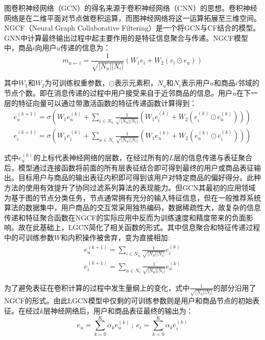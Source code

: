 \documentclass[lang=cn,11pt,a4paper,cite=authoryear]{elegantpaper}
\begin{document}
图卷积神经网络（GCN）的得名来源于卷积神经网络（CNN）的思想。卷积神经网络是在二维平面对节点做卷积运算，而图神经网络将这一运算拓展至三维空间。NGCF（Neural Graph Collaborative Filtering）是一个将GCN与CF结合的模型。GNN中计算最终输出过程中起主要作用的是特征信息聚合与传递。NGCF模型中，商品$i$向用户$u$传递的信息为：
\begin{equation}
  m_{u \leftarrow i} = \frac{1}{\sqrt{|N_u||N_i|}}(W_1e_i+W_2(e_i \odot e_u))
\end{equation}

其中$W_1$和$W_2$为可训练权重参数，$\odot$表示元素积，$N_u$和$N_i$表示用户$u$和商品$i$邻域的节点个数。即在消息传递的过程中用户接受来自于近邻商品的信息。用户$u$在下一层的特征向量可以通过带激活函数的特征传递函数计算得到：
\begin{gather}
  e_u^{(k+1)} = \sigma(W_1e_u^{(k)}+\sum_{i\in N_u}\frac{1}{\sqrt{|N_u||N_i|}}(W_1e_i^{(k)}+W_2(e_i^{(k)}\odot e_u^{(k)}))) \\
  e_i^{(k+1)} = \sigma(W_1e_i^{(k)}+\sum_{u\in N_i}\frac{1}{\sqrt{|N_u||N_i|}}(W_1e_u^{(k)}+W_2(e_u^{(k)}\odot e_i^{(k)})))
\end{gather}

式中$e_u^{(k)}$的上标代表神经网络的层数，在经过所有的$L$层的信息传递与表征聚合后，模型通过连接函数将前面的所有层表征结合即可得到最终的用户或商品表征输出。目标用户与商品的输出表征内积即可得到该用户对特定商品的偏好得分。此种方法的使用有效提升了协同过滤系列算法的表现能力。但GCN其最初的应用领域为基于图的节点分类任务，节点通常拥有充分的输入特征信息，但在一般推荐系统算法的数据集中，用户商品的交互常采用独热编码，数据稀疏性大，故复杂的信息传递和特征聚合函数在NGCF的实际应用中反而为训练速度和精度带来的负面影响。故在此基础上，LGCN简化了相关函数的形式。其中信息聚合和特征传递过程中的可训练参数$W$和内积操作被舍弃，变为直接相加:
\begin{gather}
  e_u^{(k+1)} = \sum_{i\in N_u}\frac{1}{\sqrt{|N_u||N_i|}}e_i^{(k)} \\
  e_i^{(k+1)} = \sum_{u\in N_i}\frac{1}{\sqrt{|N_u||N_i|}}e_u^{(k)}
\end{gather}

为了避免表征在卷积计算的过程中发生量纲上的变化，式中$\frac{1}{\sqrt{|N_u||N_i|}}$的部分沿用了NGCF的形式。由此LGCN模型中仅剩的可训练参数则是用户和商品节点的初始表征。在经过$k$层神经网络后，用户和商品表征最终的输出为：
\begin{equation}
  e_u = \sum_{k=0}^K\alpha_ke_u^{(k)} \ ; \ e_i = \sum_{k=0}^K\alpha_ke_i^{(k)}
\end{equation}
\end{document}
